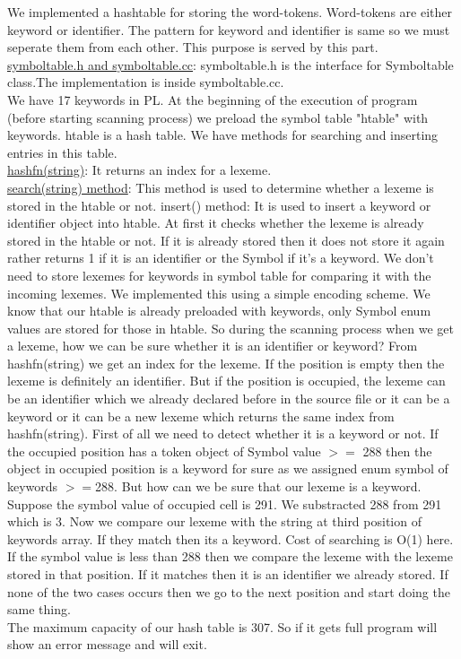 \documentclass[paper=letter, fontsize=11pt]{scrartcl} %
\begin{document}
We implemented a hashtable for storing the word-tokens. Word-tokens are either keyword or identifier. The pattern for keyword and identifier is same so we must seperate them from each other. This purpose is served by this part.\\
\underline {symboltable.h and symboltable.cc}: symboltable.h  is the interface for Symboltable class.The implementation is inside symboltable.cc.\\
We have 17 keywords in PL. At the beginning of the execution of program (before starting scanning process) we preload the symbol table "htable" with keywords. htable is a hash table.
We have methods for searching and inserting entries in this table.\\
\underline {hashfn(string)}: It returns an index for a lexeme.\\
\underline {search(string) method}: This method is used to  determine whether a lexeme is stored in the htable or not. 
insert() method: It is used to insert a keyword or identifier object into htable. At first it checks whether the lexeme is already stored in the htable or not. If it is already stored then it does not store it again rather returns 1 if it is an identifier or the Symbol if it's a keyword. We don't need to store lexemes for keywords in symbol table for comparing it with the incoming lexemes. We implemented this using a simple encoding scheme. We know that our htable is already preloaded with keywords, only Symbol enum values are stored for those in htable. So during the scanning process when we get a lexeme, how we can be sure whether it is an identifier or keyword? From hashfn(string) we get an index for the lexeme. If the position is empty then the lexeme is definitely an identifier. But if the position is occupied, the lexeme can be an identifier which we already declared before in the source file or it can be a keyword or it can be a new lexeme which returns the same index from hashfn(string).
First of all we need to detect whether it is a keyword or not. If the occupied position has a token object of Symbol value $>=$ 288 then the object in occupied position is a keyword for sure as we assigned enum symbol of keywords $>=$288. But how can we be sure that our lexeme is a keyword. Suppose the symbol value of occupied cell is 291. We substracted 288 from 291 which is 3. Now we compare our lexeme with the string at third position of keywords array. If they match then its a keyword. Cost of searching is O(1) here. If the symbol value is less than 288 then we compare the lexeme with the lexeme stored in that position. If it matches then it is an identifier we already stored. If none of the two cases occurs then we go to the next position and start doing the same thing.\\

The maximum capacity of our hash table is 307. So if it gets full program will show an error message and will exit.  \\
\end{document}
